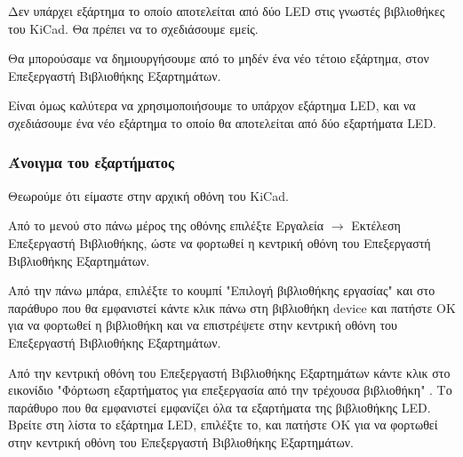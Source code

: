 \documentclass[a4paper]{article}
\begin{document}
Δεν υπάρχει εξάρτημα το οποίο αποτελείται από δύο \textenglish{LED} στις γνωστές βιβλιοθήκες του \textenglish{KiCad}. Θα πρέπει να το σχεδιάσουμε εμείς.

Θα μπορούσαμε να δημιουργήσουμε από το μηδέν ένα νέο τέτοιο εξάρτημα, στον Επεξεργαστή Βιβλιοθήκης Εξαρτημάτων. 

Είναι όμως καλύτερα να χρησιμοποιήσουμε το υπάρχον εξάρτημα \textenglish{LED}, και να σχεδιάσουμε ένα νέο εξάρτημα το οποίο θα αποτελείται από δύο εξαρτήματα \textenglish{LED}.

\subsubsection{Άνοιγμα του εξαρτήματος}
Θεωρούμε ότι είμαστε στην αρχική οθόνη του \textenglish{KiCad}. 

Από το μενού στο πάνω μέρος της οθόνης επιλέξτε Εργαλεία $\rightarrow$ Εκτέλεση Επεξεργαστή Βιβλιοθήκης, ώστε να φορτωθεί η κεντρική οθόνη του Επεξεργαστή Βιβλιοθήκης Εξαρτημάτων.

\begin{figure}
  \begin{center}
    \label{fig:kicad-main}
  \end{center}
\end{figure}

Από την πάνω μπάρα, επιλέξτε το κουμπί "Επιλογή βιβλιοθήκης εργασίας" και στο παράθυρο που θα εμφανιστεί κάντε κλικ πάνω στη βιβλιοθήκη device και πατήστε ΟΚ για να φορτωθεί η βιβλιοθήκη και να επιστρέψετε στην κεντρική οθόνη του Επεξεργαστή Βιβλιοθήκης Εξαρτημάτων.

Από την κεντρική οθόνη του Επεξεργαστή Βιβλιοθήκης Εξαρτημάτων κάντε κλικ στο εικονίδιο "Φόρτωση εξαρτήματος για επεξεργασία από την τρέχουσα βιβλιοθήκη" %
. Το παράθυρο που θα εμφανιστεί εμφανίζει όλα τα εξαρτήματα της βιβλιοθήκης \textenglish{LED}. Βρείτε στη λίστα το εξάρτημα \textenglish{LED}, επιλέξτε το, και πατήστε ΟΚ για να φορτωθεί στην κεντρική οθόνη του Επεξεργαστή Βιβλιοθήκης Εξαρτημάτων.

\begin{figure}
  \begin{center}
    \label{fig:kicad-main}
  \end{center}
\end{figure}
\end{document}
